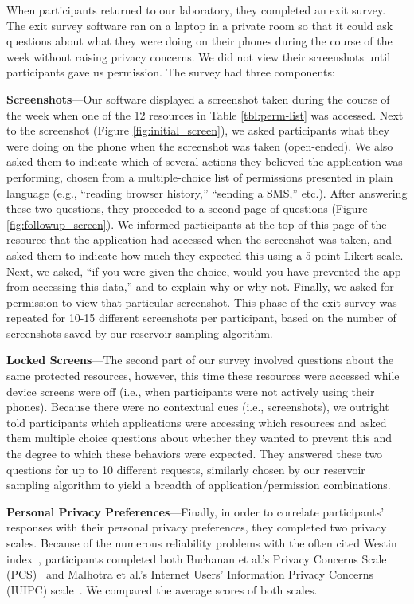 \documentclass[letterpaper,twocolumn,10pt]{article}
\newenvironment{packed_item}{
\begin{itemize}
  \setlength{\itemsep}{1pt}
  \setlength{\parskip}{0pt}
  \setlength{\parsep}{0pt}
}{\end{itemize}}
\begin{document}
When participants returned to our laboratory, they completed an exit survey. The 
exit survey software ran on a laptop in a private room so that it could ask questions about what they were doing on their phones during the course of the week without raising privacy concerns. We did not view their screenshots until participants gave us permission. The survey had three components:

\begin{packed_item}
\item {\bf Screenshots}---Our software displayed a screenshot taken during the course of the week when one of the 12 resources in Table \ref{tbl:perm-list} was accessed. Next to the screenshot (Figure \ref{fig:initial_screen}), we asked participants what they were doing on the phone when the screenshot was taken (open-ended). We also asked them to indicate which of several actions they believed the application was performing, chosen from a multiple-choice list of permissions presented in plain language (e.g., ``reading browser history,'' ``sending a SMS,'' etc.). After answering these two questions, they proceeded to a second page of questions (Figure \ref{fig:followup_screen}). We informed participants at the top of this page of the resource that the application had accessed when the screenshot was taken, and asked them to indicate how much they expected this using a 5-point Likert scale. Next, we asked, ``if you were given the choice, would you have prevented the app from accessing this data,'' and to explain why or why not. Finally, we asked for permission to view that particular screenshot. This phase of the exit survey was repeated for 10-15 different screenshots per participant, based on the number of screenshots saved by our reservoir sampling algorithm.

\item {\bf Locked Screens}---The second part of our survey involved questions about the same protected resources, however, this time these resources were accessed while device screens were off (i.e., when participants were not actively using their phones). Because there were no contextual cues (i.e., screenshots), we outright told participants which applications were accessing which resources and asked them multiple choice questions about whether they wanted to prevent this and the degree to which these behaviors were expected. They answered these two questions for up to 10 different requests, similarly chosen by our reservoir sampling algorithm to yield a breadth of application/permission combinations.

\item {\bf Personal Privacy Preferences}---Finally, in order to correlate participants' responses with their personal privacy preferences, they completed two privacy scales. Because of the numerous reliability problems with the often cited Westin index~\cite{Woodruff2014}, participants completed both Buchanan et al.'s Privacy Concerns Scale (PCS)~\cite{Buchanan2007} and Malhotra et al.'s Internet Users' Information Privacy Concerns (IUIPC) scale~\cite{Malhotra04}. We compared the average scores of both scales.
\end{packed_item}
\end{document}
